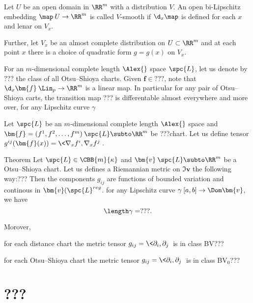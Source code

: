 Let $U$ be an open domain in $\RR^m$ with a distribution $V$.
An open bi-Lipschitz embedding $\map\:U\to \RR^m$ is called $V$-smooth if 
$\d_x\map$ is defined for each $x$ and lenar on $V_x$.

Further, let $V_x$ be an almost complete distribution on $U\subset \RR^m$
and at each point $x$ there is a choice of quadratic form $g=g(x)$ on $V_x$.
 

For an $m$-dimensional complete length $\Alex{}$ space $\spc{L}$, let us denote by $???$ the class of all Otsu--Shioya charts.
Given $\bm{f}\in???$, note that $\d_x\bm{f}\:\Lin_p\to\RR^m$ is a linear map.
In particular for any pair of Otsu--Shioya carts,
the transition map ??? is differentable almost everywhere and more over,
for any Lipschitz curve $\gamma$

Let $\spc{L}$ be an $m$-dimensional complete length $\Alex{}$ space 
and $\bm{f}=(f^1,f^2,\dots,f^m)\:\spc{L}\subto\RR^m$ be ???chart.
Let us define tensor $g^{ij}(\bm{f}(x))=\<\nabla_x f^i,\nabla_x f^j\>$.

\begin{thm}{Theorem}
Let $\spc{L}\in\CBB{m}{\kappa}$
and $\bm{v}\:\spc{L}\subto\RR^m$ be a Otsu--Shioya chart.
Let us defines a Riemannian metric on $\Im \bm{v}$ the following way:???
Then the components $g_{ij}$ are functions of bounded variation and  continous in $\bm{v}(\spc{L}^{reg}$.
for any Lipschitz curve $\gamma\:[a,b]\to\Dom\bm{v}$, we have
\[\length\gamma= ???.\]


Morover, 

for each distance chart 
the metric tensor $g_{ij}=\<\partial_i,\partial_j\>$ is in class BV???

for each Otsu--Shioya chart 
the metric tensor $g_{ij}=\<\partial_i,\partial_j\>$ is in class BV$_0$???
\end{thm}


\section{???}

